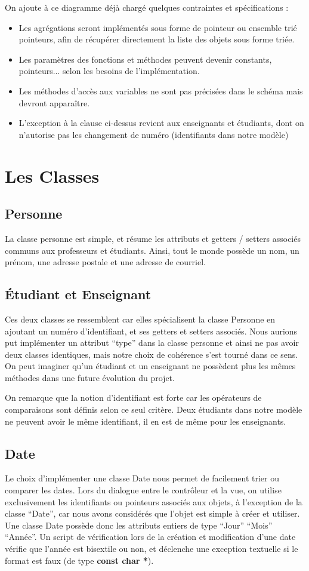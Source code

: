 \documentclass[a4paper,11pt]{report}
\begin{document}
	On ajoute à ce diagramme déjà chargé quelques contraintes et spécifications :
	\begin{itemize}
	 \item Les agrégations seront implémentés sous forme de pointeur ou ensemble trié pointeurs, afin de récupérer directement la liste des objets sous forme triée.
	 \item Les paramètres des fonctions et méthodes peuvent devenir constants, pointeurs... selon les besoins de l'implémentation.
	 \item Les méthodes d'accès aux variables ne sont pas précisées dans le schéma mais devront apparaître.
	 \item L'exception à la clause ci-dessus revient aux enseignants et étudiants, dont on n'autorise pas les changement de numéro (identifiants dans notre modèle)
	\end{itemize}
	
	\section{Les Classes}
	\subsection{Personne}
		La classe personne est simple, et résume les attributs et getters / setters associés communs aux professeurs et étudiants. Ainsi, tout le monde possède un nom, un prénom, une adresse postale et une adresse de courriel.
	\subsection{Étudiant et Enseignant}
		Ces deux classes se ressemblent car elles spécialisent la classe Personne en ajoutant un numéro d'identifiant, et ses getters et setters associés. Nous aurions put implémenter un attribut ``type'' dans la classe personne et ainsi ne pas avoir deux classes identiques, mais notre choix de cohérence s'est tourné dans ce sens. On peut imaginer qu'un étudiant et un enseignant ne possèdent plus les mêmes méthodes dans une future évolution du projet.
		
		On remarque que la notion d'identifiant est forte car les opérateurs de comparaisons sont définis selon ce seul critère. Deux étudiants dans notre modèle ne peuvent avoir le même identifiant, il en est de même pour les enseignants.
	\subsection{Date}
		Le choix d'implémenter une classe Date nous permet de facilement trier ou comparer les dates. Lors du dialogue entre le contrôleur et la vue, on utilise exclusivement les identifiants ou pointeurs associés aux objets, à l'exception de la classe ``Date'', car nous avons considérés que l'objet est simple à créer et utiliser.
		Une classe Date possède donc les attributs entiers de type ``Jour'' ``Mois'' ``Année''. Un script de vérification lors de la création et modification d'une date vérifie que l'année est bisextile ou non, et déclenche une exception textuelle si le format est faux (de type \textbf{const char *}).
\end{document}
